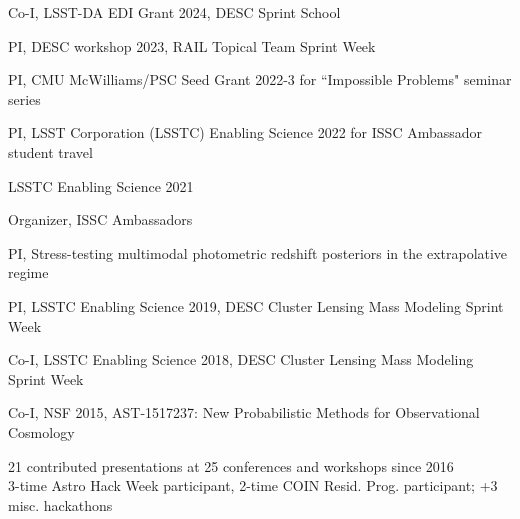 \documentclass[11pt,letterpaper]{article}
\begin{document}
 \begin{list}{}{\malzlist}
 \item Co-I, LSST-DA EDI Grant 2024, DESC Sprint School
 \item PI, DESC workshop 2023, RAIL Topical Team Sprint Week
 \item PI, CMU McWilliams/PSC Seed Grant 2022-3 for ``Impossible Problems" seminar series
 \item PI, LSST Corporation (LSSTC) Enabling Science 2022 for ISSC Ambassador student travel
 \item LSSTC Enabling Science 2021
\begin{list}{}{\malzlist}
	\item Organizer, ISSC Ambassadors 
	\item PI, Stress-testing multimodal photometric redshift posteriors in the extrapolative regime
\end{list}
 \item PI, LSSTC Enabling Science 2019, DESC Cluster Lensing Mass Modeling Sprint Week%
 \item Co-I, LSSTC Enabling Science 2018, DESC Cluster Lensing Mass Modeling Sprint Week%
\item Co-I, NSF 2015, AST-1517237: New Probabilistic Methods for Observational Cosmology
\end{list}


21 contributed presentations at 25 conferences and workshops since 2016\\
3-time Astro Hack Week participant, 2-time COIN Resid. Prog. participant; +3 misc. hackathons

%
\clearpage
\end{document}
